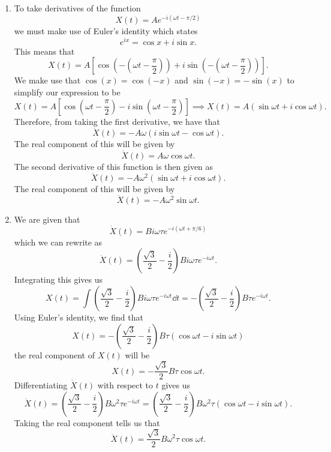 \begin{sol}
\begin{enumerate}[label=\textbf{(\alph*)}]
    \item To take derivatives of the function 
    \[X(t) = Ae^{-i (\omega t - \pi/2)}\]
    we must make use of Euler's identity which states 
    \[e^{ix} = \cos x + i\sin x.\]
    This means that 
    \[X (t) = A\left[\cos \left(-\left(\omega t - \frac{\pi}{2}\right)\right) + i\sin \left(-\left(\omega t - \frac{\pi}{2}\right)\right)\right].\]
    We make use that $\cos (x) = \cos (-x)$ and $\sin (-x) = -\sin (x)$ to simplify our expression to be 
    \[X(t) = A\left[ \cos \left(\omega t - \frac{\pi}{2}\right) - i\sin \left(\omega t - \frac{\pi}{2}\right)\right]\implies X(t) = \boxed{A(\sin \omega t + i\cos\omega t)} .\]
    Therefore, from taking the first derivative, we have that 
    \[\dot{X}(t) = -A\omega (i\sin \omega t - \cos\omega t).\]
    The real component of this will be given by 
    \[\dot{X}(t) = \boxed{A\omega\cos\omega t}.\]
    The second derivative of this function is then given as 
    \[\ddot{X}(t) = -A\omega^2 (\sin \omega t + i\cos \omega t).\]
    The real component of this will be given by 
    \[\ddot{X}(t) = \boxed{-A\omega^2 \sin \omega t}.\]
    
    \item We are given that 
    \[\dot{X}(t) = \boxed{Bi\omega\tau e^{-i(\omega t + \pi/6)}}\]
    which we can rewrite as 
    \[\dot{X} (t) = \left(\frac{\sqrt{3}}{2} - \frac{i}{2}\right)Bi\omega\tau e^{-i\omega t}.\]
    Integrating this gives us 
    \[X (t) = \int \left(\frac{\sqrt{3}}{2} - \frac{i}{2}\right)Bi\omega\tau e^{-i\omega t} \dd t = -\left(\frac{\sqrt{3}}{2} - \frac{i}{2}\right)B\tau e^{-i\omega t}.\]
    Using Euler's identity, we find that 
    \[X (t) = -\left(\frac{\sqrt{3}}{2} - \frac{i}{2}\right)B\tau (\cos \omega t - i\sin \omega t)\]
    the real component of $X(t)$ will be 
    \[X(t) = \boxed{ - \frac{\sqrt{3}}{2}B\tau \cos\omega t}.\]
    Differentiating $\dot{X} (t)$ with respect to $t$ gives us 
    \[\ddot{X} (t) = \left(\frac{\sqrt{3}}{2} - \frac{i}{2}\right)B\omega^2\tau e^{-i\omega t} = \left(\frac{\sqrt{3}}{2} - \frac{i}{2}\right)B\omega^2\tau(\cos \omega t - i\sin \omega t).\]
    Taking the real component tells us that
    \[\ddot{X} (t) = \boxed{\frac{\sqrt{3}}{2} B\omega^2 \tau \cos\omega t}.\]
\end{enumerate}
\end{sol}